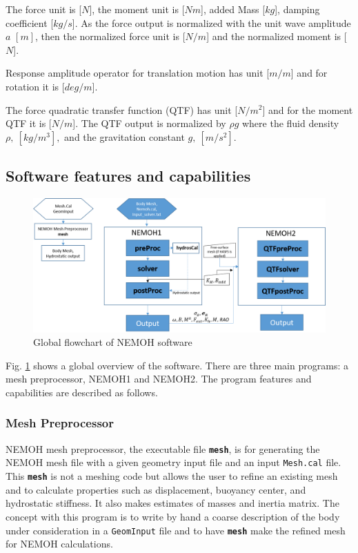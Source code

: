 \documentclass[12pt,a4paper,titlepage]{article}
\begin{document}
The force unit is [$N$], the moment unit is [$Nm$], added Mass [$kg$], damping coefficient [$kg/s$]. As the force output is normalized with the unit wave amplitude $a$ $[m]$, then the normalized force unit is [$N/m$] and the normalized moment is [$N$].

Response amplitude operator for translation motion has unit [$m/m$] and for rotation it is [$deg/m$].

The force quadratic transfer function (QTF) has unit [$N/m^2$] and for the moment QTF it is [$N/m$]. The QTF output is normalized by $\rho g$ where the fluid density $\rho,\ [kg/m^3],$ and the gravitation constant $g,\ [m/s^2]$.

\subsection{Software features and capabilities}
\begin{figure}[ht]
\centering
\includegraphics[scale=0.6,trim = 0mm 0mm 0mm 0mm, clip]{figures/FlowChart.png}
\caption{Global flowchart of NEMOH software}\label{fig:flowchart}
\end{figure}

Fig. \ref{fig:flowchart} shows a global overview of the software. There are three main programs: a mesh preprocessor, NEMOH1 and NEMOH2. The program features and capabilities are described as follows.

\subsubsection{Mesh Preprocessor}
NEMOH mesh preprocessor, the executable file \texttt{\textbf{mesh}}, is for generating the NEMOH mesh file with a given geometry input file and an input \texttt{Mesh.cal} file. This \texttt{\textbf{mesh}} is not a meshing code but allows the user to refine an existing mesh and to calculate properties such as displacement, buoyancy center, and hydrostatic stiffness. It also makes estimates of masses and inertia matrix. The concept with this program is to write by hand a coarse description of the body under consideration in a \texttt{GeomInput} file and to have \texttt{\textbf{mesh}} make the refined mesh for NEMOH calculations.
\end{document}
